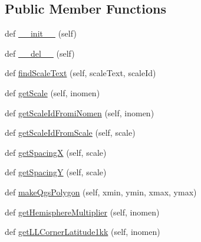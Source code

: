 \subsection*{Public Member Functions}
\begin{DoxyCompactItemize}
\item 
def \mbox{\hyperlink{class_dsg_tools_1_1_layer_tools_1_1_create_frame_tool_1_1map__index_1_1_utm_grid_ab2231acb8ee79bbc978495607a4e8e6a}{\+\_\+\+\_\+init\+\_\+\+\_\+}} (self)
\item 
def \mbox{\hyperlink{class_dsg_tools_1_1_layer_tools_1_1_create_frame_tool_1_1map__index_1_1_utm_grid_aa7a34c97b1b77985625bca5b496bc1c7}{\+\_\+\+\_\+del\+\_\+\+\_\+}} (self)
\item 
def \mbox{\hyperlink{class_dsg_tools_1_1_layer_tools_1_1_create_frame_tool_1_1map__index_1_1_utm_grid_ab732f5b04d64f32b3b67eec2ed0217cc}{find\+Scale\+Text}} (self, scale\+Text, scale\+Id)
\item 
def \mbox{\hyperlink{class_dsg_tools_1_1_layer_tools_1_1_create_frame_tool_1_1map__index_1_1_utm_grid_a5526730674c00c9312d8c4278ed06c75}{get\+Scale}} (self, inomen)
\item 
def \mbox{\hyperlink{class_dsg_tools_1_1_layer_tools_1_1_create_frame_tool_1_1map__index_1_1_utm_grid_ac2da63f852d93d4540cb483662ce48e6}{get\+Scale\+Id\+Fromi\+Nomen}} (self, inomen)
\item 
def \mbox{\hyperlink{class_dsg_tools_1_1_layer_tools_1_1_create_frame_tool_1_1map__index_1_1_utm_grid_af41076b4415ef2d1ad434f4a9f73ca1f}{get\+Scale\+Id\+From\+Scale}} (self, scale)
\item 
def \mbox{\hyperlink{class_dsg_tools_1_1_layer_tools_1_1_create_frame_tool_1_1map__index_1_1_utm_grid_a678ab9e5c9a2457837c2719eeeb1c0be}{get\+SpacingX}} (self, scale)
\item 
def \mbox{\hyperlink{class_dsg_tools_1_1_layer_tools_1_1_create_frame_tool_1_1map__index_1_1_utm_grid_ab251ae61488ef7308d8efd2ea02010e8}{get\+SpacingY}} (self, scale)
\item 
def \mbox{\hyperlink{class_dsg_tools_1_1_layer_tools_1_1_create_frame_tool_1_1map__index_1_1_utm_grid_ad3d5253b7101efeb9013a23103041c7f}{make\+Qgs\+Polygon}} (self, xmin, ymin, xmax, ymax)
\item 
def \mbox{\hyperlink{class_dsg_tools_1_1_layer_tools_1_1_create_frame_tool_1_1map__index_1_1_utm_grid_ae505e6ba649d2dff7573438196cd8f5e}{get\+Hemisphere\+Multiplier}} (self, inomen)
\item 
def \mbox{\hyperlink{class_dsg_tools_1_1_layer_tools_1_1_create_frame_tool_1_1map__index_1_1_utm_grid_aecd1f1dd22ac5ca3ceb9b2ae70d94130}{get\+L\+L\+Corner\+Latitude1kk}} (self, inomen)

\end{DoxyCompactItemize}
